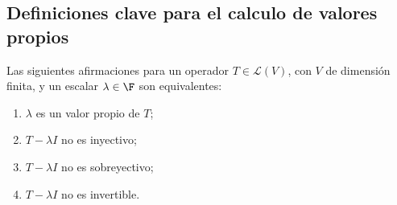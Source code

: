 \documentclass{scrartcl}
\begin{document}
%

\subsection{Definiciones clave para el calculo de valores propios}

\begin{definition}
  Las siguientes afirmaciones para un operador $T\in \mathcal{L}(V)$, con $V$ de dimensión finita, y un escalar $\lambda \in \F$ son equivalentes:
\begin{enumerate}[label=(\alph*)]
    \item $\lambda$ es un valor propio de $T$;
    \item $T - \lambda I$ no es inyectivo;
    \item $T - \lambda I$ no es sobreyectivo;
    \item $T - \lambda I$ no es invertible.
\end{enumerate}
\end{definition}
\end{document}

